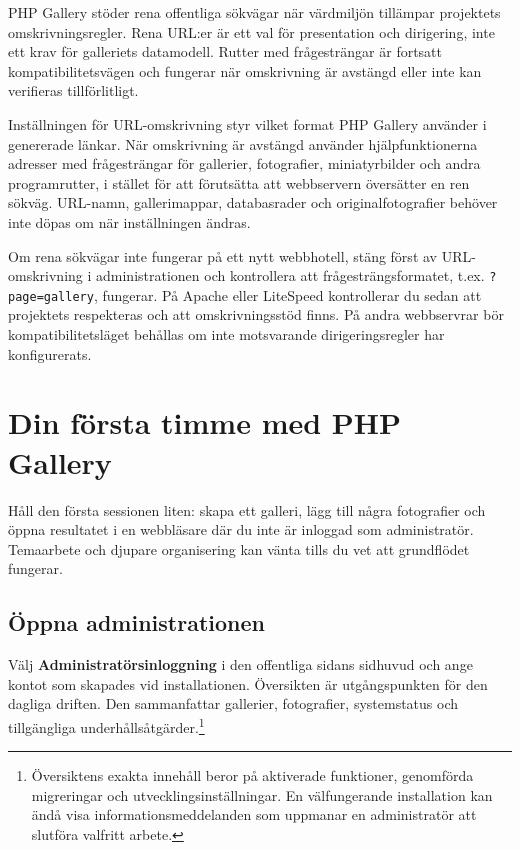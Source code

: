 \documentclass[11pt,a4paper]{article}
\newcommand{\filepath}[1]{\path{#1}}
\newcommand{\ui}[1]{\textbf{#1}}
\newcommand{\codeword}[1]{\nolinkurl{#1}}
\begin{document}
PHP Gallery stöder rena offentliga sökvägar när värdmiljön tillämpar projektets
omskrivningsregler. Rena URL:er är ett val för presentation och dirigering, inte
ett krav för galleriets datamodell. Rutter med frågesträngar är fortsatt
kompatibilitetsvägen och fungerar när omskrivning är avstängd eller inte kan
verifieras tillförlitligt.

Inställningen för URL-omskrivning styr vilket format PHP Gallery använder i
genererade länkar. När omskrivning är avstängd använder hjälpfunktionerna
adresser med frågesträngar för gallerier, fotografier, miniatyrbilder och andra
programrutter, i stället för att förutsätta att webbservern översätter en ren
sökväg. URL-namn, gallerimappar, databasrader och originalfotografier behöver
inte döpas om när inställningen ändras.

Om rena sökvägar inte fungerar på ett nytt webbhotell, stäng först av
URL-omskrivning i administrationen och kontrollera att frågesträngsformatet,
t.ex. \codeword{?page=gallery}, fungerar. På Apache eller LiteSpeed kontrollerar
du sedan att projektets \filepath{.htaccess} respekteras och att
omskrivningsstöd finns. På andra webbservrar bör kompatibilitetsläget behållas
om inte motsvarande dirigeringsregler har konfigurerats.

\section{Din första timme med PHP Gallery}
\label{sec:first-hour}

Håll den första sessionen liten: skapa ett galleri, lägg till några fotografier
och öppna resultatet i en webbläsare där du inte är inloggad som administratör.
Temaarbete och djupare organisering kan vänta tills du vet att grundflödet
fungerar.

\subsection{Öppna administrationen}

Välj \ui{Administratörsinloggning} i den offentliga sidans sidhuvud och ange
kontot som skapades vid installationen. Översikten är utgångspunkten för den
dagliga driften. Den sammanfattar gallerier, fotografier, systemstatus och
tillgängliga underhållsåtgärder.\footnote{Översiktens exakta innehåll beror på
aktiverade funktioner, genomförda migreringar och utvecklingsinställningar. En
välfungerande installation kan ändå visa informationsmeddelanden som uppmanar en
administratör att slutföra valfritt arbete.}
\end{document}
